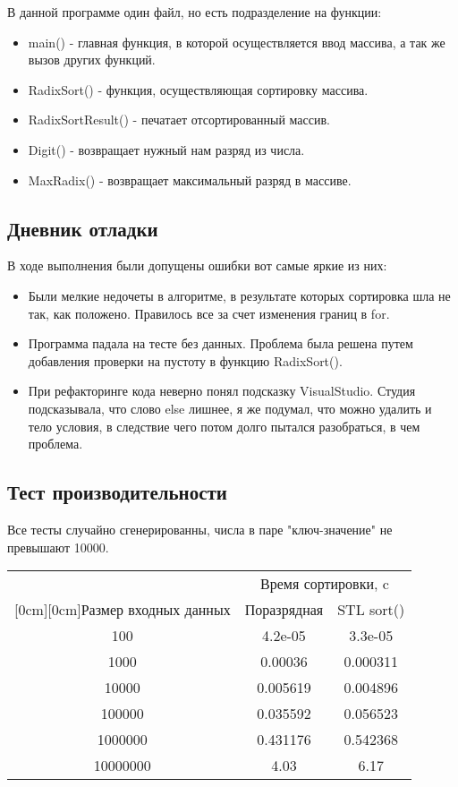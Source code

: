 \documentclass[12pt]{article}
\begin{document}
В данной программе один файл, но есть подразделение на функции:
\begin{itemize}
\item main() - главная функция, в которой осуществляется ввод массива, а так же вызов других функций.
\item RadixSort() - функция, осуществляющая сортировку массива.
\item RadixSortResult() - печатает отсортированный массив.
\item Digit() - возвращает нужный нам разряд из числа.
\item MaxRadix() - возвращает максимальный разряд в массиве.

\end{itemize}

\subsection*{Дневник отладки}
В ходе выполнения были допущены ошибки вот самые яркие из них:

\begin{itemize}
\item Были мелкие недочеты в алгоритме, в результате которых сортировка шла не так, как положено. Правилось все за счет изменения границ в for.
\item Программа падала на тесте без данных. Проблема была решена путем добавления проверки на пустоту в функцию RadixSort().
\item При рефакторинге кода неверно понял подсказку VisualStudio. Студия подсказывала, что слово else лишнее, я же подумал, что можно удалить и тело условия, в следствие чего потом долго пытался разобраться, в чем проблема.
\end{itemize}

\subsection*{Тест производительности}

Все тесты случайно сгенерированны, числа в паре "ключ-значение" не превышают 10000.

\begin{table} [h]

\begin{center}
\begin{tabular}{|c|c|c|}
\hline
& \multicolumn{2}{c|}{Время сортировки, c} \\
\cline{2-3}
\raisebox{1.5ex}[0cm][0cm]{Размер входных данных}
& Поразрядная & STL sort() \\
\hline
100 & 4.2e-05 & 3.3e-05 \\
\hline
1000 &  0.00036 & 0.000311 \\
\hline
10000 & 0.005619 & 0.004896 \\
\hline
100000 & 0.035592 & 0.056523 \\
\hline
1000000 & 0.431176 & 0.542368 \\
\hline
10000000 &  4.03 & 6.17\\
\hline
\end{tabular}
\end{center}
\end{table}
\end{document}
